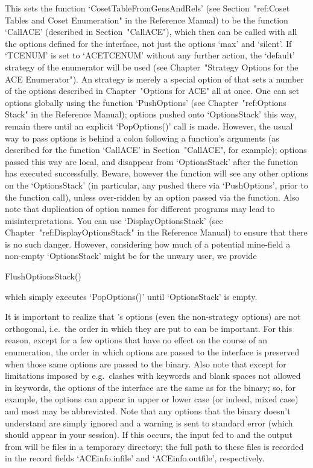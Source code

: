 This    sets    the    function    `CosetTableFromGensAndRels'    (see
Section~"ref:Coset  Tables  and  Coset  Enumeration"  in  the   {\GAP}
Reference  Manual)  to  be  the  function  `CallACE'   (described   in
Section~"CallACE"), which then can be  called  with  all  the  options
defined for the {\ACE} interface,  not  just  the  options  `max'  and
`silent'. If `TCENUM'  is  set  to  `ACETCENUM'  without  any  further
action, the `default' strategy of the {\ACE} enumerator will  be  used
(see Chapter~"Strategy Options for the  ACE  Enumerator").  An  {\ACE}
strategy is merely a special option of {\ACE} that sets  a  number  of
the options described in Chapter~"Options for ACE"  all
at once. One can set options globally using the function `PushOptions'
(see Chapter~"ref:Options Stack"  in  the  {\GAP}  Reference  Manual);
options pushed onto `OptionsStack' this way,  remain  there  until  an
explicit `PopOptions()' call is made. However, the usual way  to  pass
options is  behind  a  colon  following  a  function's  arguments  (as
described  for  the  function  `CallACE'  in  Section~"CallACE",   for
example); options passed  this  way  are  local,  and  disappear  from
`OptionsStack' after the function has executed  successfully.  Beware,
however the function will see any other options on the  `OptionsStack'
(in particular, any pushed  there  via  `PushOptions',  prior  to  the
function call),  unless  over-ridden  by  an  option  passed  via  the
function. Also note that duplication of  option  names  for  different
programs   may   lead   to    misinterpretations.    You    can    use
`DisplayOptionsStack' (see  Chapter~"ref:DisplayOptionsStack"  in  the
{\GAP} Reference Manual) to ensure  that  there  is  no  such  danger.
However, considering how much of a potential  mine-field  a  non-empty
`OptionsStack' might be for the unwary user, we provide

\>FlushOptionsStack()

which simply executes `PopOptions()' until `OptionsStack' is empty.

It  is  important  to  realize  that  {\ACE}'s   options   (even   the
non-strategy options) are not orthogonal, i.e.\  the  order  in  which
they are put to {\ACE} can be important. For this reason, except for a
few options that have no effect on the course of an  enumeration,  the
order in which options are passed to the {\ACE} interface is preserved
when those same options are passed to the  {\ACE}  binary.  Also  note
that except for limitations  imposed  by  {\GAP}  e.g.\  clashes  with
{\GAP} keywords and blank spaces not allowed in keywords, the  options
of the {\ACE} interface are the  same  as  for  the  binary;  so,  for
example, the options can appear in upper or  lower  case  (or  indeed,
mixed case) and most may be abbreviated. Note that  any  options  that
the {\ACE} binary doesn't understand are simply ignored and a  warning
is sent  to  standard  error  (which  should  appear  in  your  {\GAP}
session). If this occurs, the input fed to {\ACE} and the output  from
{\ACE} will be files in a temporary directory; the full path to  these
files  is  recorded  in  the  record   fields   `ACEinfo.infile'   and
`ACEinfo.outfile', respectively.

